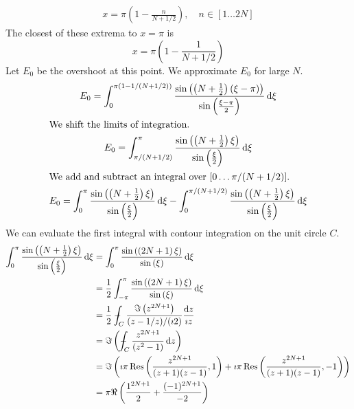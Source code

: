 {\begin{Solution}
\begin{enumerate}
\begin{gather*}
      \\
      x = \pi \left( 1 - \frac{n}{N + 1/2} \right), \quad n \in [1 \ldots 2 N]
    \end{gather*}
    The closest of these extrema to $x = \pi$ is
    \[
    x = \pi \left( 1 - \frac{1}{N + 1/2} \right)
    \]
    Let $E_0$ be the overshoot at this point.
    We approximate $E_0$ for large $N$.
    \begin{gather*}
      E_0 = \int_0^{\pi(1-1/(N+1/2))} 
      \frac{ \sin \left( \left( N + \frac{1}{2} \right)(\xi - \pi) \right) }
      { \sin \left( \frac{\xi - \pi}{2} \right) }\,\mathrm{d} \xi
      \\
      \intertext{We shift the limits of integration.}
      E_0 = \int_{\pi/(N+1/2)}^\pi
      \frac{ \sin \left( \left( N + \frac{1}{2} \right)\xi \right) }
      { \sin \left( \frac{\xi}{2} \right) }\,\mathrm{d} \xi
      \\
      \intertext{We add and subtract an integral over $[0 \ldots \pi/(N+1/2)]$.}
      E_0 = \int_0^\pi \frac{ \sin \left( \left( N + \frac{1}{2} \right)\xi \right) }
      { \sin \left( \frac{\xi}{2} \right) }\,\mathrm{d} \xi
      - \int_0^{\pi/(N+1/2)}
      \frac{ \sin \left( \left( N + \frac{1}{2} \right)\xi \right) }
      { \sin \left( \frac{\xi}{2} \right) }\,\mathrm{d} \xi
    \end{gather*}
    We can evaluate the first integral with contour integration on the unit
    circle $C$.
    \begin{align*}
      \int_0^\pi \frac{ \sin \left( \left( N + \frac{1}{2} \right)\xi \right) }
      { \sin \left( \frac{\xi}{2} \right) }\,\dd \xi
      &= \int_0^\pi \frac{ \sin \left( \left( 2 N + 1 \right) \xi \right) }
      { \sin \left( \xi \right) }\,\dd \xi
      \\
      &= \frac{1}{2} \int_{-\pi}^\pi \frac{ \sin \left( \left( 2 N + 1 \right) \xi \right) }
      { \sin \left( \xi \right) }\,\dd \xi
      \\
      &= \frac{1}{2} \pv \int_C \frac{ \Im \left( z^{2 N + 1} \right) }{(z - 1/z)/(\imath 2)}
      \frac{\dd z}{\imath z}
      \\
      &= \Im \left( \pv \int_C \frac{ z^{2 N + 1} }{(z^2 - 1)} \,\dd z \right)
      \\
      &= \Im \left( \imath \pi \Res \left( \frac{ z^{2 N + 1} }{(z + 1)(z - 1)}, 1 \right)
        + \imath \pi \Res \left( \frac{ z^{2 N + 1} }{(z + 1)(z - 1)}, - 1 \right) \right)
      \\
      &= \pi \Re \left( \frac{ 1^{2 N + 1} }{ 2 }
        + \frac{ (-1)^{2 N + 1} }{ -2 } \right)

\end{align*}
\end{enumerate}
\end{Solution}}
